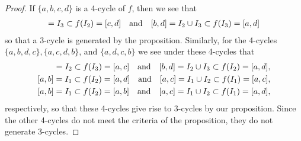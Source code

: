 \begin{proof}
  If $\{a,b,c,d\}$ is a 4-cycle of $f$, then we see that
  \begin{align*}
    [c, d] = I_3 \subset f(I_2) = [c,d] \text{\quad and\quad}  [b, d] = I_2 \cup I_3 \subset f(I_3) = [a,d]
  \end{align*}
  so that a 3-cycle is generated by the proposition.
  Similarly, for the 4-cycles $\{a,b,d,c\}, \{a,c,d,b\}$, and $\{a,d,c,b\}$ we see under these 4-cycles that
  \begin{align*}
    [b, c] = I_2 \subset f(I_3) = [a,c] \text{\quad and\quad}  [b, d] = I_2 \cup I_3 \subset f(I_2) = [a,d],\\
    [a, b] = I_1 \subset f(I_2) = [a,d] \text{\quad and\quad}  [a, c] = I_1 \cup I_2 \subset f(I_1) = [a,c], \\
    [a, b] = I_1 \subset f(I_2) = [a,b] \text{\quad and\quad}  [a, c] = I_1 \cup I_2 \subset f(I_1) = [a,d],
  \end{align*}
  respectively, so that these 4-cycles give rise to 3-cycles by our proposition.
  Since the other 4-cycles do not meet the criteria of the proposition, they do not generate 3-cycles.

\end{proof}
\newpage
